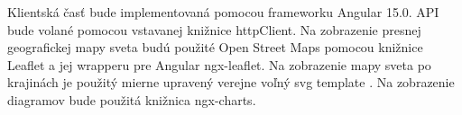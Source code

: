 Klientská časť bude implementovaná pomocou frameworku Angular 15.0. API bude volané pomocou vstavanej knižnice httpClient. Na zobrazenie 
presnej geografickej mapy sveta budú použité Open Street Maps pomocou knižnice Leaflet a jej wrapperu pre Angular ngx-leaflet. Na zobrazenie 
mapy sveta po krajinách je použitý mierne upravený verejne voľný svg template \cite{svg_mapa}. Na zobrazenie diagramov bude použitá knižnica ngx-charts. 
